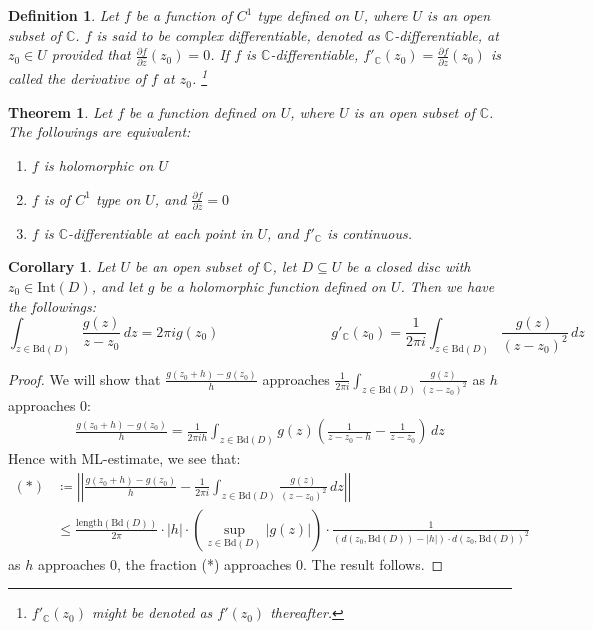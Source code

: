 \documentclass[11pt,oneside]{book}
\theoremstyle{break}
\theoremstyle{break}
\newtheorem{thm}{Theorem}[section]
\newtheorem{corT}[lem]{Corollary}
\newtheorem{defn}{Definition}[corL]
\newcommand{\Complex}{\mathbb{C}}
\newcommand{\Int}{\text{Int}}
\newcommand{\Bd}{\text{Bd}}
\newcommand{\pd}{\partial}
\begin{document}
\begin{defn}
Let $f$ be a function of $C^1$ type defined on $U$, where $U$ is an open subset of $\Complex$. $f$ is said to be complex differentiable, denoted as $\Complex$-differentiable, at $z_0\in U$ provided that $\frac{\partial f}{\partial \bar{z}}(z_0)= 0$. If $f$ is $\Complex$-differentiable, $f'_{\Complex}(z_0) = \frac{\pd f}{\pd z}(z_0)$ is called the derivative of $f$ at $z_0$. \footnote{$f'_{\Complex}(z_0)$ might be denoted as $f'(z_0)$ thereafter.}
\end{defn}

\begin{thm}
Let $f$ be a function defined on $U$, where $U$ is an open subset of $\Complex$. The followings are equivalent:
\begin{enumerate}[topsep=3pt,itemsep=-1ex,partopsep=1ex,parsep=1ex]
\item $f$ is holomorphic on $U$
\item $f$ is of $C^1$ type on $U$, and $\frac{\pd f}{\pd \bar{z}} = 0$ 
\item $f$ is $\Complex$-differentiable at each point in $U$, and $f'_{\Complex}$ is continuous. 
\end{enumerate}
\end{thm}


\begin{corT}
Let $U$ be an open subset of $\Complex$, let $D\subseteq U$ be a closed disc with $z_0 \in \Int(D)$, and let $g$ be a holomorphic function defined on $U$. Then we have the followings:
$$\int_{z \in \Bd(D)} \frac{g(z)}{z-z_0}\, dz = 2\pi i g(z_0) \qquad\qquad\qquad\qquad g'_{\Complex}(z_0) = \frac{1}{2\pi i}\int_{z\in \Bd(D)} \frac{g(z)}{(z-z_0)^2}\, dz$$
\end{corT}
\begin{proof}
We will show that $\frac{g(z_0+h)-g(z_0)}{h}$ approaches $ \frac{1}{2\pi i}\int_{z\in \Bd(D)} \frac{g(z)}{(z-z_0)^2}$ as $h $ approaches $0$:
\begin{align*}
\frac{g(z_0+h)-g(z_0)}{h}= \frac{1}{2\pi i h}\int_{z\in \Bd(D)} g(z) \left( \frac{1}{z-z_0-h} - \frac{1}{z-z_0}\right)\, dz
\end{align*}
Hence with ML-estimate, we see that:
\begin{align*}
(*)&\coloneqq  \left|\left|\frac{g(z_0+h)-g(z_0)}{h} -\frac{1}{2\pi i}\int_{z\in \Bd(D)} \frac{g(z)}{(z-z_0)^2}\, dz\right|\right| \\
&\leq \frac{\text{length}(\Bd(D))}{2\pi}\cdot |h|\cdot \left(\sup_{z \in \Bd(D)}|g(z)|\right)\cdot \frac{1}{(d(z_0,\Bd(D)) - |h|) \cdot d(z_0,\Bd(D))^2} 
\end{align*}
as $h$ approaches $0$, the fraction (*) approaches $0$. The result follows.
\end{proof}
\end{document}

